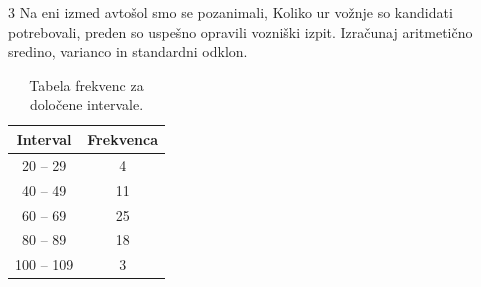 \begin{Vaje}{3}
    Na eni izmed avtošol smo se pozanimali, Koliko ur vožnje so kandidati potrebovali, preden so uspešno opravili vozniški izpit. Izračunaj aritmetično sredino, varianco in standardni odklon.
    \begin{table}[h!]
        \centering
        \begin{tabular}{|c|c|}
        \hline
        \textbf{Interval} & \textbf{Frekvenca} \\ \hline
        20 -- 29          & 4                  \\ \hline
        40 -- 49          & 11                 \\ \hline
        60 -- 69          & 25                 \\ \hline
        80 -- 89          & 18                 \\ \hline
        100 -- 109        & 3                  \\ \hline
        \end{tabular}
        \caption{Tabela frekvenc za določene intervale.}
    \end{table}
\end{Vaje}